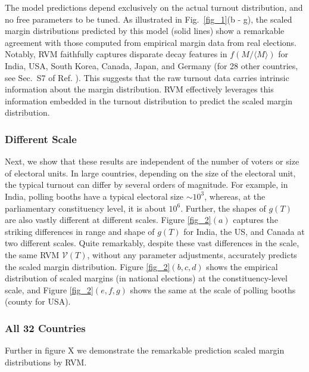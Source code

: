 The model predictions depend exclusively on the actual turnout distribution, and no free parameters to be tuned. As illustrated in Fig.~\ref{fig_1}(b - g), the scaled margin distributions predicted by this model (solid lines) show a remarkable agreement with those computed from empirical margin data from real elections. Notably, RVM faithfully captures disparate decay features in  $f(M/\langle M \rangle)$ for India, USA, South Korea, Canada, Japan, and Germany (for 28 other countries, see Sec.~S7 of Ref. \cite{supp}). This suggests that the raw turnout data carries intrinsic information about the margin distribution. RVM effectively leverages this information embedded in the turnout distribution to predict the scaled margin distribution. 
\begin{figure}
    
\end{figure}
\subsubsection{Different Scale}
Next, we show that these results are independent of the number of voters or size of electoral units. In large countries, depending on the size of the electoral unit, the typical turnout can differ by several orders of magnitude. For example, in India, polling booths have a typical electoral size $\sim 10^3$, whereas, at the parliamentary constituency level, it is about $10^6$. Further, the shapes of $g(T)$ are also vastly different at different scales. Figure \ref{fig_2}$(a)$ captures the striking differences in range and shape of $g(T)$ for India, the US, and Canada at two different scales. Quite remarkably, despite these vast differences in the scale, the same RVM ${\mathcal V}(T)$, without any parameter adjustments, accurately predicts the scaled margin distribution. Figure \ref{fig_2}$(b, c, d)$ shows the empirical distribution of scaled margins (in national elections) at the constituency-level scale, and Figure \ref{fig_2}$(e, f, g)$ shows the same at the scale of polling booths (county for USA).

\begin{figure}
    
\end{figure}

\subsubsection{All 32 Countries}
Further in figure X we demonstrate the remarkable prediction scaled margin distributions by RVM.

